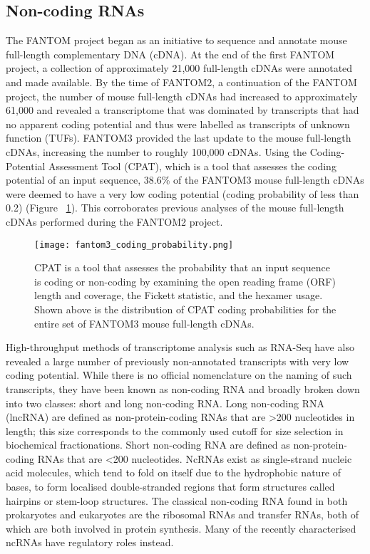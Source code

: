 \subsection{Non-coding RNAs}

The FANTOM project began as an initiative to sequence and annotate mouse full-length complementary DNA (cDNA)\cite{pmid11217851}. At the end of the first FANTOM project, a collection of approximately 21,000 full-length cDNAs were annotated and made available. By the time of FANTOM2, a continuation of the FANTOM project, the number of mouse full-length cDNAs had increased to approximately 61,000 and revealed a transcriptome that was dominated by transcripts that had no apparent coding potential and thus were labelled as transcripts of unknown function (TUFs)\cite{pmid12466851}. FANTOM3 provided the last update to the mouse full-length cDNAs, increasing the number to roughly 100,000 cDNAs\cite{pmid16141072}. Using the Coding-Potential Assessment Tool (CPAT)\cite{pmid23335781}, which is a tool that assesses the coding potential of an input sequence, 38.6\% of the FANTOM3 mouse full-length cDNAs were deemed to have a very low coding potential (coding probability of less than 0.2) (Figure ~\ref{fig:fantom3_coding_prob}). This corroborates previous analyses of the mouse full-length cDNAs performed during the FANTOM2 project.

\begin{figure}[!ht]
   \centering
   \texttt{[image: fantom3\_coding\_probability.png]}
   \caption[Coding probability of FANTOM3 mouse cDNAs]{CPAT is a tool that assesses the probability that an input sequence is coding or non-coding by examining the open reading frame (ORF) length and coverage, the Fickett statistic\cite{pmid7145702}, and the hexamer usage. Shown above is the distribution of CPAT coding probabilities for the entire set of FANTOM3 mouse full-length cDNAs\cite{tang2014fantom3codingprob}.}
   \label{fig:fantom3_coding_prob}
\end{figure}

High-throughput methods of transcriptome analysis such as RNA-Seq have also revealed a large number of previously non-annotated transcripts with very low coding potential. While there is no official nomenclature on the naming of such transcripts, they have been known as non-coding RNA and broadly broken down into two classes: short and long non-coding RNA. Long non-coding RNA (lncRNA) are defined as non-protein-coding RNAs that are \textgreater200 nucleotides in length; this size corresponds to the commonly used cutoff for size selection in biochemical fractionations. Short non-coding RNA are defined as non-protein-coding RNAs that are \textless200 nucleotides. NcRNAs exist as single-strand nucleic acid molecules, which tend to fold on itself due to the hydrophobic nature of bases, to form localised double-stranded regions that form structures called hairpins or stem-loop structures. The classical non-coding RNA found in both prokaryotes and eukaryotes are the ribosomal RNAs and transfer RNAs, both of which are both involved in protein synthesis. Many of the recently characterised ncRNAs have regulatory roles instead\cite{pmid24776770}.

